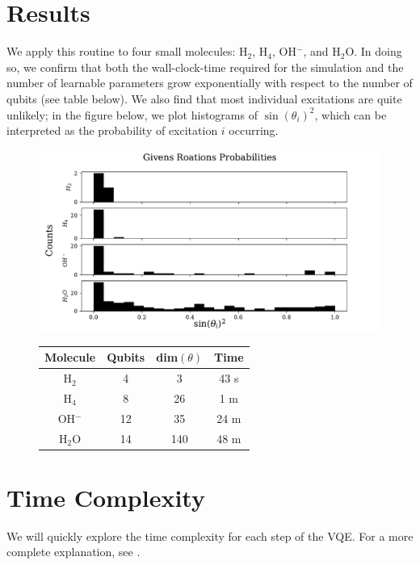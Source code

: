 \documentclass[11pt]{article}
\begin{document}
\section{Results}
We apply this routine to four small molecules: H$_2$, H$_4$, OH$^-$, and H$_2$O. In doing so, we confirm that both the wall-clock-time required for the simulation  and the number of learnable parameters grow exponentially with respect to the number of qubits (see table below). We also find that most individual excitations are  quite unlikely; in the figure below, we plot histograms of $\sin(\theta_i)^2$, which can be interpreted as the probability of excitation $i$ occurring.
\begin{figure}[!h]
  \begin{minipage}[t]{.6\linewidth}
    \centering
    \includegraphics[scale=0.45]{images/results.pdf}
  \end{minipage}\hfill
  \begin{minipage}[t]{.4\linewidth}
  \centering
  \vspace{-4.525cm}
  \renewcommand{\arraystretch}{1.65}
    \begin{tabular}{|c|c|c|c|} \hline 
         \textbf{Molecule}&  \textbf{Qubits}&  \textbf{dim}$(\theta)$& \textbf{Time} \\ \hline 
         H$_2$&  4&  3& 43 s\\ \hline 
         H$_4$&  8&  26& 1 m\\ \hline 
         OH$^-$&  12&  35& 24 m\\ \hline
         H$_2$O&  14&  140& 48 m\\ \hline
    \end{tabular}
    \renewcommand{\arraystretch}{1}
  \end{minipage}
\end{figure}


\section{Time Complexity}
We will quickly explore the time complexity for each step of the VQE. For a more complete explanation, see \cite{complex}.
\end{document}
